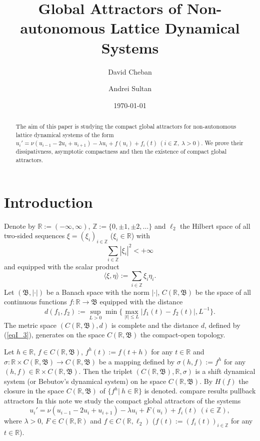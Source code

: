 \documentclass{amsart}%
\title{Global Attractors of Non-autonomous Lattice Dynamical Systems}
\author{David Cheban}
\author{Andrei Sultan}
\date{\today}
\begin{document}
\begin{abstract}
The aim of this paper is studying the compact global attractors
for non-autonomous lattice dynamical systems of the form
$u_{i}'=\nu (u_{i-1}-2u_i+u_{i+1})-\lambda u_{i}+f(u_i)+f_{i}(t)\
(i\in \mathbb Z,\ \lambda >0)$. We prove their dissipativness,
asymptotic compactness and then the existence of compact global
attractors.
\end{abstract}

\maketitle



\section{Introduction}\label{Sec1}

Denote by $\mathbb R :=(-\infty,\infty)$, $\mathbb Z :=\{0,\pm
1,\pm 2,\ldots\}$ and $\ell_{2}$ the Hilbert space of all
two-sided sequences $\xi =(\xi_{i})_{i\in \mathbb Z}$ ($\xi_{i}\in
\mathbb R$) with
\begin{equation}\label{eqI_1}
\sum\limits_{i\in \mathbb Z}|\xi_{i}|^{2}<+\infty
\end{equation}
and equipped with the scalar product
\begin{equation}\label{eqI_2}
\langle \xi,\eta\rangle :=\sum\limits_{i\in \mathbb
Z}\xi_{i}\eta_{i} .
\end{equation}
Let $(\mathfrak B, |\cdot|)$ be a Banach space with the norm
$|\cdot|$, $C(\mathbb R,\mathfrak B)$ be the space of all
continuous functions $f:\mathbb R\to \mathfrak B$ equipped with
the distance
\begin{equation}\label{eqI_3}
d(f_1,f_2):=\sup\limits_{L>0}\min\{\max\limits_{|t|\le
L}|f_{1}(t)-f_{2}(t)|,L^{-1}\}.
\end{equation}
The metric space $(C(\mathbb R,\mathfrak B),d)$ is complete and
the distance $d$, defined by (\ref{eqI_3}), generates on the space
$C(\mathbb R,\mathfrak B)$ the compact-open topology.

Let $h\in \mathbb R$, $f\in C(\mathbb R,\mathfrak B)$,
$f^{h}(t):=f(t+h)$ for any $t\in \mathbb R$ and $\sigma :\mathbb
R\times C(\mathbb R,\mathfrak B)\to C(\mathbb R,\mathfrak B)$ be a
mapping defined by $\sigma(h,f):=f^{h}$ for any $(h,f)\in \mathbb
R\times C(\mathbb R,\mathfrak B)$. Then \cite[Ch.I]{Che_2015} the
triplet $(C(\mathbb R,\mathfrak B),\mathbb R,\sigma)$ is a shift
dynamical system (or Bebutov's dynamical system) on he space
$C(\mathbb R,\mathfrak B)$. By $H(f)$ the closure in the space
$C(\mathbb R,\mathfrak B)$ of $\{f^{h}|\ h\in \mathbb R\}$ is
denoted.
{\color{red}
compare results pullback attractors
}
In this note we study the compact global attractors of the systems
\begin{equation}\label{eqI1}
u_{i}'=\nu (u_{i-1}-2u_i+u_{i+1})-\lambda u_{i}+F(u_i)+f_{i}(t)\
(i\in \mathbb Z),
\end{equation}
where $\lambda >0$, $F\in C(\mathbb R, \mathbb R)$ and $f\in
C(\mathbb R,\ell_{2})$ ($f(t):=(f_{i}(t))_{i\in \mathbb Z}$ for
any $t\in \mathbb R$).
\end{document}
